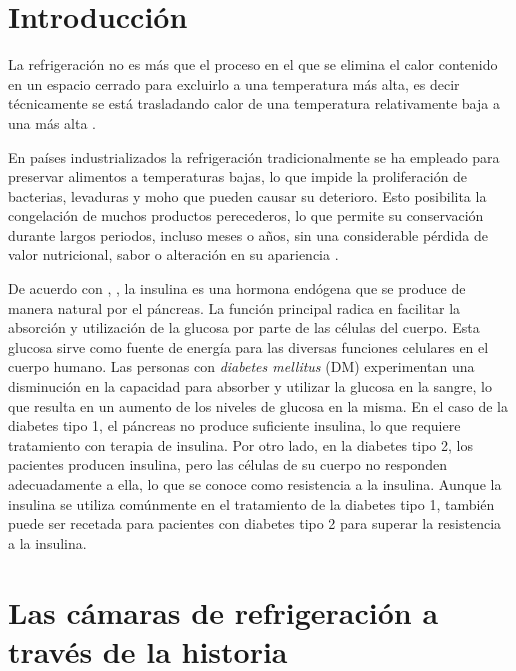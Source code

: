 \section*{Introducción}


\rsp
\setcounter{chapter}{1}
 \setcounter{page}{13}


La refrigeración no es más que el proceso en el que se elimina el calor contenido en un espacio cerrado para excluirlo a una temperatura más alta, es decir técnicamente se está trasladando calor de una temperatura relativamente baja a una más alta \cite{Hundy1984}.

En países industrializados la refrigeración tradicionalmente se ha empleado para preservar alimentos a temperaturas bajas, lo que impide la proliferación de bacterias, levaduras y moho que pueden causar su deterioro. Esto posibilita la congelación de muchos productos perecederos, lo que permite su conservación durante largos periodos, incluso meses o años, sin una considerable pérdida de valor nutricional, sabor o alteración en su apariencia \cite{britannica2023}.

De acuerdo con \citeauthor{khurana2019}, \citeyear{khurana2019}, la insulina es una hormona endógena que se produce de manera natural por el páncreas. La función principal radica en facilitar la absorción y utilización de la glucosa por parte de las células del cuerpo. Esta glucosa sirve como fuente de energía para las diversas funciones celulares en el cuerpo humano. Las personas con \textit{diabetes mellitus} (DM) experimentan una disminución en la capacidad para absorber y utilizar la glucosa en la sangre, lo que resulta en un aumento de los niveles de glucosa en la misma. En el caso de la diabetes tipo 1, el páncreas no produce suficiente insulina, lo que requiere tratamiento con terapia de insulina. Por otro lado, en la diabetes tipo 2, los pacientes producen insulina, pero las células de su cuerpo no responden adecuadamente a ella, lo que se conoce como resistencia a la insulina. Aunque la insulina se utiliza comúnmente en el tratamiento de la diabetes tipo 1, también puede ser recetada para pacientes con diabetes tipo 2 para superar la resistencia a la insulina. 

\newpage

\section{Las cámaras de refrigeración a través de la historia}

